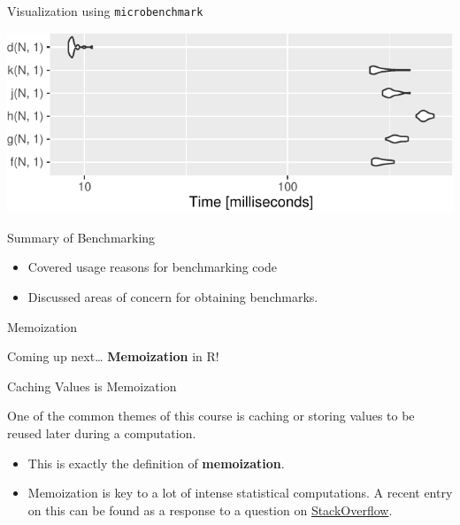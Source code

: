 \begin{frame}[fragile]{Visualization using \texttt{microbenchmark}}

\begin{Shaded}
\begin{Highlighting}[]
\end{Highlighting}
\end{Shaded}

\includegraphics{lec5_functions_recursion_memoization_benchmarking_files/figure-beamer/compare_ggplot2-1.pdf}

\end{frame}

\begin{frame}{Summary of Benchmarking}

\begin{itemize}
\tightlist
\item
  Covered usage reasons for benchmarking code
\item
  Discussed areas of concern for obtaining benchmarks.
\end{itemize}

\end{frame}

\begin{frame}{Memoization}

Coming up next\ldots{} \textbf{Memoization} in R!

\end{frame}

\begin{frame}{Caching Values is Memoization}

One of the common themes of this course is caching or storing values to
be reused later during a computation.

\begin{itemize}
\item
  This is exactly the definition of \textbf{memoization}.
\item
  Memoization is key to a lot of intense statistical computations. A
  recent entry on this can be found as a response to a question on
  \href{http://stackoverflow.com/a/36973875/1345455}{StackOverflow}.
\end{itemize}

\end{frame}

